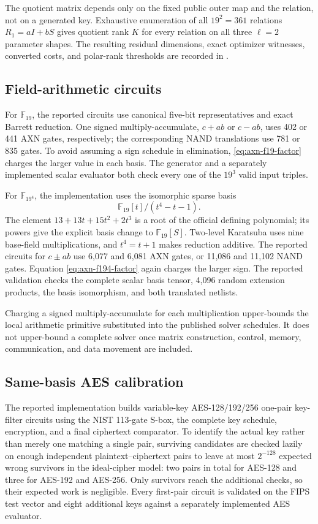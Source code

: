 \documentclass[11pt]{article}
\newcommand{\F}{\mathbb F}
\begin{document}
The quotient matrix depends only on the fixed public outer map and the
relation, not on a generated key.  Exhaustive
enumeration of all $19^2=361$ relations $R_1=aI+bS$ gives quotient rank $K$
for every relation on all three $\ell=2$ parameter shapes.  The resulting
residual dimensions, exact optimizer witnesses, converted costs, and
polar-rank thresholds are recorded in
.

\subsection{Field-arithmetic circuits}\label{app:field-circuits}

For $\F_{19}$, the reported circuits use canonical five-bit representatives
and exact Barrett reduction.  One signed multiply-accumulate, $c+ab$ or
$c-ab$, uses 402 or 441 AXN gates, respectively; the corresponding NAND
translations use 781 or 835 gates.  To avoid assuming a sign schedule in
elimination, \eqref{eq:axn-f19-factor} charges the larger value in each basis.
The generator and a separately implemented scalar evaluator both check every
one of the $19^3$ valid input triples.

For $\F_{19^4}$, the implementation uses the isomorphic sparse basis
\[
 \F_{19}[t]/(t^4-t-1).
\]
The element $13+13t+15t^2+2t^3$ is a root of the official defining
polynomial; its powers give the explicit basis change to $\F_{19}[S]$.
Two-level Karatsuba uses nine base-field multiplications, and $t^4=t+1$ makes
reduction additive.  The reported circuits for $c\mathbin{\pm}ab$ use 6,077
and 6,081 AXN gates, or 11,086 and 11,102 NAND gates.  Equation
\eqref{eq:axn-f194-factor} again charges the larger sign.  The reported
validation checks the complete scalar basis tensor, 4,096 random extension
products, the basis isomorphism, and both translated netlists.

Charging a signed multiply-accumulate for each multiplication upper-bounds
the local arithmetic primitive substituted into the published solver
schedules.  It does not upper-bound a complete solver once matrix
construction, control, memory, communication, and data movement are included.

\subsection{Same-basis AES calibration}\label{app:aes-calibration}

The reported implementation builds variable-key AES-128/192/256 one-pair
key-filter circuits using the NIST 113-gate S-box, the complete key schedule,
encryption, and a final ciphertext comparator.  To identify the actual key
rather than merely one matching a single pair, surviving candidates are
checked lazily on enough independent plaintext--ciphertext pairs to leave at
most $2^{-128}$ expected wrong survivors in the ideal-cipher model: two pairs
in total for AES-128 and three for AES-192 and AES-256.  Only survivors reach
the additional checks, so their expected work is negligible.  Every
first-pair circuit is validated on the FIPS test vector and eight additional
keys against a separately implemented AES evaluator.
\end{document}
